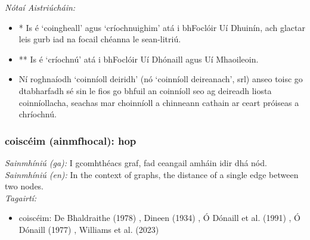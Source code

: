  \noindent \textit{Nótaí Aistriúcháin:}
\begin{itemize}
	\item * Is é `coingheall' agus `críochnuighim' atá i bhFoclóir Uí Dhuinín, ach glactar leis gurb iad na focail chéanna le sean-litriú.
	\item ** Is é `críochnú' atá i bhFoclóir Uí Dhónaill agus Uí Mhaoileoin.
	\item Ní roghnaíodh `coinníoll deiridh' (nó `coinníoll deireanach', srl) anseo toisc go dtabharfadh sé sin le fios go bhfuil an coinníoll seo ag deireadh liosta coinníollacha, seachas mar choinníoll a chinneann cathain ar ceart próiseas a chríochnú.
\end{itemize}


\subsubsection*{coiscéim (ainmfhocal): hop}
 \noindent \textit{Sainmhíniú (ga):} I gcomhthéacs graf, fad ceangail amháin idir dhá nód.
\\
 \noindent \textit{Sainmhíniú (en):} In the context of graphs, the distance of a single edge between two nodes.
\\
 \noindent \textit{Tagairtí:}
\begin{itemize}
	\item coiscéim: De Bhaldraithe (1978) \cite{de-bhaldraithe}, Dineen (1934) \cite{dineen}, Ó Dónaill et al. (1991) \cite{focloir-beag}, Ó Dónaill (1977) \cite{odonaill}, Williams et al. (2023) \cite{storchiste}
\end{itemize}

